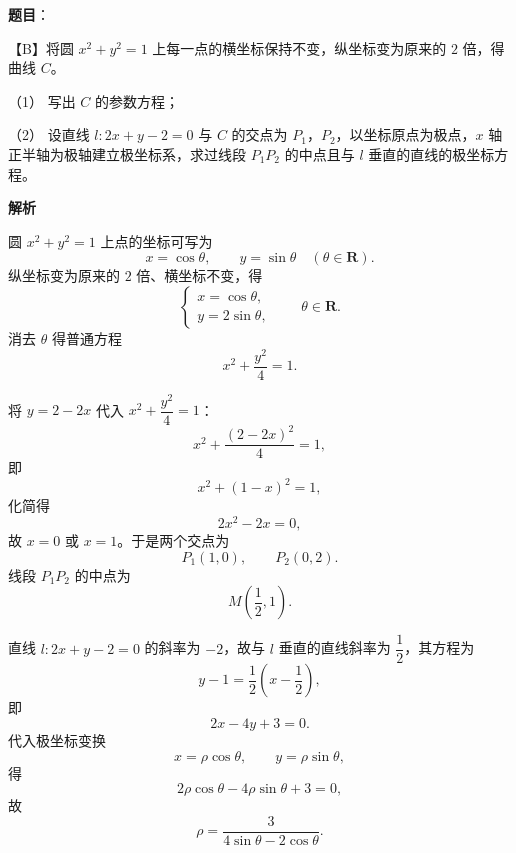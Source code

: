 \begin{answer}

\textbf{题目}：

【B】将圆 $x^2+y^2=1$ 上每一点的横坐标保持不变，纵坐标变为原来的 $2$ 倍，得曲线 $C$。

（1） 写出 $C$ 的参数方程；

（2） 设直线 $l:2x+y-2=0$ 与 $C$ 的交点为 $P_1$，$P_2$，以坐标原点为极点，$x$ 轴正半轴为极轴建立极坐标系，求过线段 $P_1P_2$ 的中点且与 $l$ 垂直的直线的极坐标方程。

\textbf{解析}


圆 $x^2+y^2=1$ 上点的坐标可写为
\nopagebreak[4]
\[x=\cos\theta,\qquad y=\sin\theta\quad(\theta\in\mathbf R).\]
纵坐标变为原来的 $2$ 倍、横坐标不变，得
\nopagebreak[4]
\[\begin{cases}
x=\cos\theta,\\
y=2\sin\theta,
\end{cases}\qquad\theta\in\mathbf R.\]
消去 $\theta$ 得普通方程
\nopagebreak[4]
\[x^2+\frac{y^2}4=1.\]


将 $y=2-2x$ 代入 $x^2+\dfrac{y^2}4=1$：
\nopagebreak[4]
\[x^2+\frac{(2-2x)^2}{4}=1,\]
即
\nopagebreak[4]
\[x^2+(1-x)^2=1,\]
化简得
\nopagebreak[4]
\[2x^2-2x=0,\]
故 $x=0$ 或 $x=1$。于是两个交点为
\nopagebreak[4]
\[P_1(1,0),\qquad P_2(0,2).\]
线段 $P_1P_2$ 的中点为
\nopagebreak[4]
\[M\left(\frac12,1\right).\]

直线 $l:2x+y-2=0$ 的斜率为 $-2$，故与 $l$ 垂直的直线斜率为 $\dfrac12$，其方程为
\nopagebreak[4]
\[y-1=\frac12\left(x-\frac12\right),\]
即
\nopagebreak[4]
\[2x-4y+3=0.\]
代入极坐标变换
\nopagebreak[4]
\[x=\rho\cos\theta,\qquad y=\rho\sin\theta,\]
得
\nopagebreak[4]
\[2\rho\cos\theta-4\rho\sin\theta+3=0,\]
故
\nopagebreak[4]
\[\rho=\frac3{4\sin\theta-2\cos\theta}.\]



\end{answer}
